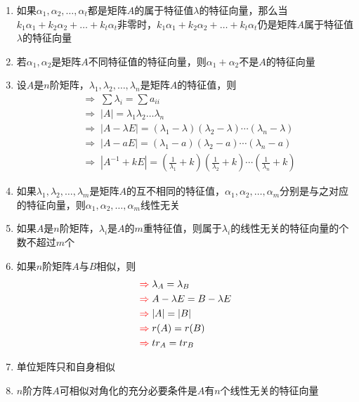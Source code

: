 \documentclass[a4paper,12pt]{article}
\begin{document}
    \begin{enumerate}
        \item 如果$\alpha_1, \alpha_2, \dots, \alpha_t$都是矩阵$A$的属于特征值$\lambda$的特征向量，那么当$k_1\alpha_1 + k_2\alpha_2 + \dots + k_t\alpha_t$非零时，$k_1\alpha_1 + k_2\alpha_2 + \dots + k_t\alpha_t$仍是矩阵$A$属于特征值$\lambda$的特征向量
        \item 若$\alpha_1, \alpha_2$是矩阵$A$不同特征值的特征向量，则$\alpha_1 + \alpha_2$不是$A$的特征向量
        \item 设$A$是$n$阶矩阵，$\lambda_1, \lambda_2, \dots, \lambda_n$是矩阵$A$的特征值，则
        \begin{align*}
            &\Rightarrow\; \sum \lambda_i = \sum a_{ii}  \\
            &\Rightarrow\; |A| =\lambda_1\lambda_2\dots\lambda_n \\
            &\Rightarrow\; |A - \lambda E| = (\lambda_1 - \lambda)(\lambda_2 - \lambda)\cdots(\lambda_n - \lambda) \\
            &\Rightarrow\; |A - aE| = (\lambda_1 - a)(\lambda_2 - a)\cdots(\lambda_n - a) \\
            &\Rightarrow\; |A^{-1} + kE| = (\frac{1}{\lambda_1} + k)(\frac{1}{\lambda_2} + k)\cdots(\frac{1}{\lambda_n} + k)
        \end{align*}
        \item 如果$\lambda_1, \lambda_2, \dots, \lambda_m$是矩阵$A$的互不相同的特征值，$\alpha_1, \alpha_2, \dots, \alpha_m$分别是与之对应的特征向量，则$\alpha_1, \alpha_2, \dots, \alpha_m$线性无关
        \item 如果$A$是$n$阶矩阵，$\lambda_i$是$A$的$m$重特征值，则属于$\lambda_i$的线性无关的特征向量的个数不超过$m$个
        \item 如果$n$阶矩阵$A$与$B$相似，则
        \begin{align*}
            &{\color{red}{\Rightarrow}}\; \lambda_A = \lambda_B  \\
            &{\color{red}{\Rightarrow}}\; A - \lambda E = B - \lambda E  \\
            &{\color{red}{\Rightarrow}}\; |A| = |B| \\
            &{\color{red}{\Rightarrow}}\; r(A) = r(B) \\
            &{\color{red}{\Rightarrow}}\; tr_A = tr_B
        \end{align*}
        \item 单位矩阵只和自身相似
        \item $n$阶方阵$A$可相似对角化的充分必要条件是$A$有$n$个线性无关的特征向量

\end{enumerate}
\end{document}
